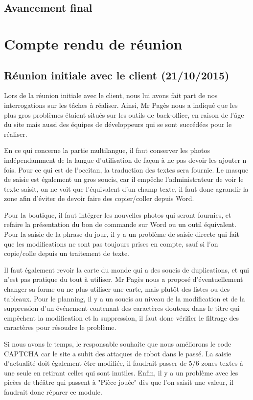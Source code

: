 \documentclass[11pt]{report}
\begin{document}
\subsection{Avancement final}


\section{Compte rendu de réunion}
\subsection{Réunion initiale avec le client (21/10/2015)}
Lors de la réunion initiale avec le client, nous lui avons fait part de nos 
interrogations sur les tâches à réaliser. Ainsi, Mr Pagès nous a indiqué que les
plus gros problèmes étaient situés sur les outils de back-office, en raison de 
l'âge du site mais aussi des équipes de développeurs qui se sont succédées pour
le réaliser. \\
\par En ce qui concerne la partie multilangue, il faut conserver les photos
indépendamment de la langue d'utilisation de façon à ne pas devoir les ajouter
n-fois. Pour ce qui est de l'occitan, la traduction des textes sera fournie.
Le masque de saisie est également un gros soucis, car il empêche
l'administrateur de voir le texte saisit, on ne voit que l'équivalent d'un
champ texte, il faut donc agrandir la zone afin d'éviter de devoir faire des
copier/coller depuis Word. \\
\par Pour la boutique, il faut intégrer les nouvelles photos qui seront
fournies, et refaire la présentation du bon de commande sur Word ou un outil
équivalent. Pour la saisie de la phrase du jour, il y a un problème de saisie
directe qui fait que les modifications ne sont pas toujours prises en compte,
sauf si l'on copie/colle depuis un traitement de texte. \\
\par Il faut également revoir la carte du monde qui a des soucis de
duplications, et qui n'est pas pratique du tout à utiliser. Mr Pagès nous a proposé
d'éventuellement changer sa forme ou ne plus utiliser une carte, mais plutôt
des listes ou des tableaux. Pour le planning, il y a un soucis au niveau de la
modification et de la suppression d'un événement contenant des caractères
douteux dans le titre qui empêchent la modification et la suppression, il faut
donc vérifier le filtrage des caractères pour résoudre le problème. \\
\par Si nous avons le temps, le responsable souhaite que nous améliorons le code
CAPTCHA car le site a subit des attaques de robot dans le passé.
La saisie d'actualité doit également être modifiée, il faudrait passer de 5/6
zones textes à une seule en retirant celles qui sont inutiles.
Enfin, il y a un problème avec les picèes de théâtre qui passent à "Pièce
jouée" dès que l'on saisit une valeur, il faudrait donc réparer ce module.
\end{document}

